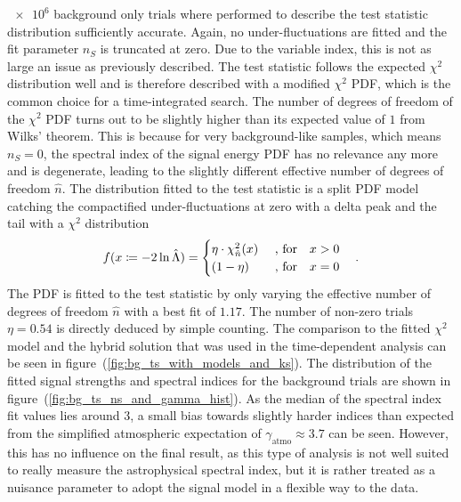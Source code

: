 $\num{e6}$ background only trials where performed to describe the test statistic distribution sufficiently accurate.
Again, no under-fluctuations are fitted and the fit parameter $n_S$ is truncated at zero.
Due to the variable index, this is not as large an issue as previously described.
The test statistic follows the expected $\chi^2$ distribution well and is therefore described with a modified $\chi^2$ PDF, which is the common choice for a time-integrated search.
The number of degrees of freedom of the $\chi^2$ PDF turns out to be slightly higher than its expected value of $\num{1}$ from Wilks' theorem.
This is because for very background-like samples, which means $n_S=0$, the spectral index of the signal energy PDF has no relevance any more and is degenerate, leading to the slightly different effective number of degrees of freedom $\hat{n}$.
The distribution fitted to the test statistic is a split PDF model catching the compactified under-fluctuations at zero with a delta peak and the tail with a $\chi^2$ distribution
\begin{equation}
  \label{equ:delta_chi2_pdf}
  f(x \coloneqq -2\ln\hat{\Lambda}) =
  \begin{cases}
    \eta \cdot \chi^2_{\hat{n}}(x) &\text{ , for}\quad x > 0 \\
    (1 - \eta) &\text{ , for}\quad x = 0
  \end{cases}
  \quad\text{.}
\end{equation}
The PDF is fitted to the test statistic by only varying the effective number of degrees of freedom $\hat{n}$ with a best fit of $\num{1.17}$.
The number of non-zero trials $\eta=\num{0.54}$ is directly deduced by simple counting.
The comparison to the fitted $\chi^2$ model and the hybrid solution that was used in the time-dependent analysis can be seen in figure~(\ref{fig:bg_ts_with_models_and_ks}).
The distribution of the fitted signal strengths and spectral indices for the background trials are shown in figure~(\ref{fig:bg_ts_ns_and_gamma_hist}).
As the median of the spectral index fit values lies around $\num{3}$, a small bias towards slightly harder indices than expected from the simplified atmospheric expectation of $\gamma_\text{atmo} \approx 3.7$ can be seen.
However, this has no influence on the final result, as this type of analysis is not well suited to really measure the astrophysical spectral index, but it is rather treated as a nuisance parameter to adopt the signal model in a flexible way to the data.

